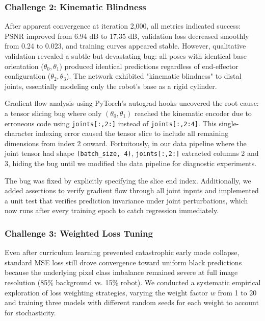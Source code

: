 \documentclass[12pt,a4paper,oneside]{report}
\begin{document}
\subsubsection{Challenge 2: Kinematic Blindness}
\label{subsubsec:challenge_2_kinematic_blindness}

After apparent convergence at iteration 2,000, all metrics indicated success: PSNR improved from 6.94 dB to 17.35 dB, validation loss decreased smoothly from 0.24 to 0.023, and training curves appeared stable. However, qualitative validation revealed a subtle but devastating bug: all poses with identical base orientation ($\theta_0, \theta_1$) produced identical predictions regardless of end-effector configuration ($\theta_2, \theta_3$). The network exhibited "kinematic blindness" to distal joints, essentially modeling only the robot's base as a rigid cylinder.

Gradient flow analysis using PyTorch's autograd hooks uncovered the root cause: a tensor slicing bug where only $(\theta_0, \theta_1)$ reached the kinematic encoder due to erroneous code using \texttt{joints[:,2:]} instead of \texttt{joints[:,2:4]}. This single-character indexing error caused the tensor slice to include all remaining dimensions from index 2 onward. Fortuitously, in our data pipeline where the joint tensor had shape \texttt{(batch\_size, 4)}, \texttt{joints[:,2:]} extracted columns 2 and 3, hiding the bug until we modified the data pipeline for diagnostic experiments.

The bug was fixed by explicitly specifying the slice end index. Additionally, we added assertions to verify gradient flow through all joint inputs and implemented a unit test that verifies prediction invariance under joint perturbations, which now runs after every training epoch to catch regression immediately.

\subsubsection{Challenge 3: Weighted Loss Tuning}
\label{subsubsec:challenge_3_weighted_loss_tuning}

Even after curriculum learning prevented catastrophic early mode collapse, standard MSE loss still drove convergence toward uniform black predictions because the underlying pixel class imbalance remained severe at full image resolution (85\% background vs. 15\% robot). We conducted a systematic empirical exploration of loss weighting strategies, varying the weight factor $w$ from 1 to 20 and training three models with different random seeds for each weight to account for stochasticity.
\end{document}
